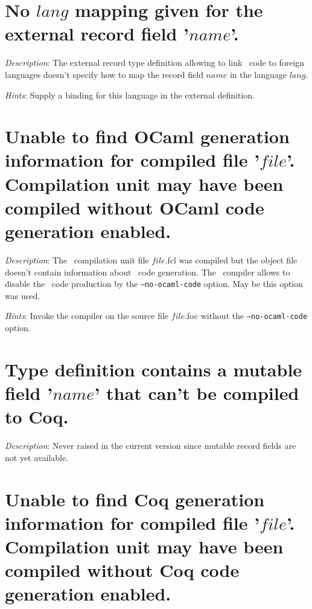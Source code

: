 \section*{No $lang$ mapping given for the external record field
  '$name$'.}

{\em Description}: The external record type definition allowing to
link \focal\ code to foreign languages doesn't specify how to map the
record field $name$ in the language $lang$.

{\em Hints}: Supply a binding for this language in the external
definition.



\section*{Unable to find OCaml generation information for compiled
  file '$file$'. Compilation unit may have been compiled without OCaml code
  generation enabled.}

{\em Description}: The \focal\ compilation unit file $file$.fcl was compiled but
the object file doesn't contain information about \ocaml\ code
generation. The \focal\ compiler allows to disable the \ocaml\ code
production by the {\tt --no-ocaml-code} option. May be this option was used.

{\em Hints}: Invoke the compiler on the source file $file$.foc without
the {\tt --no-ocaml-code} option.



\section*{Type definition contains a mutable field '$name$' that can't
  be compiled to Coq.}

{\em Description}: {\color{red} Never raised in the current version
  since mutable record fields are not yet available}.



\section*{Unable to find Coq generation information for compiled file
  '$file$'. Compilation unit may have been compiled without Coq code
  generation enabled.}

